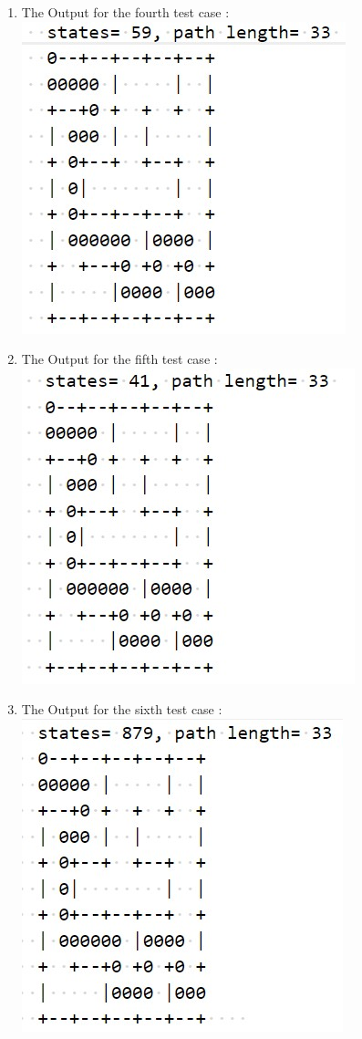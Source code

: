 \documentclass{article}
\begin{document}
\begin{enumerate}
    \item The Output for the fourth test case :
    \\\includegraphics{Output4.jpg}
\newpage
    \item The Output for the fifth test case :
    \\\includegraphics{Output5.jpg}
    \item The Output for the sixth test case :
    \\\includegraphics{Output6.jpg}
\end{enumerate}
\vspace{20pt}
\end{document}
